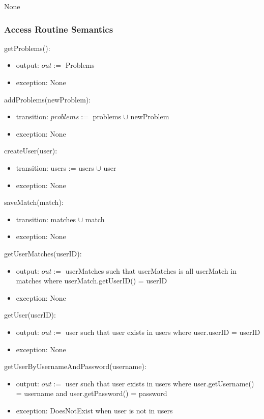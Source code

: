 \documentclass[12pt, titlepage]{article}
\begin{document}
None

\subsubsection{Access Routine Semantics}

\noindent getProblems():
\begin{itemize}
\item output: $out :=$ Problems
\item exception: None
\end{itemize}

\noindent addProblems(newProblem):
\begin{itemize}
\item transition: $problems :=$ problems $\cup$ newProblem
\item exception: None
\end{itemize}

\noindent createUser(user):
\begin{itemize}
\item transition: users := users  $\cup$ user
\item exception: None
\end{itemize}

\noindent saveMatch(match):
\begin{itemize}
\item transition: matches $\cup$ match 
\item exception: None
\end{itemize}

\noindent getUserMatches(userID):
\begin{itemize}
\item output:  $out :=$ userMatches such that userMatches is all userMatch in matches where userMatch.getUserID() = userID
\item exception: None
\end{itemize}

\noindent getUser(userID):
\begin{itemize}
\item output: $out :=$ user such that user exists in users where user.userID = userID
\item exception: None 
\end{itemize}

\noindent getUserByUsernameAndPassword(username):
\begin{itemize}
\item output: $out :=$ user such that user exists in users where user.getUsername() = username and user.getPassword() = password
\item exception: DoesNotExist when user is not in users 
\end{itemize}
\end{document}
